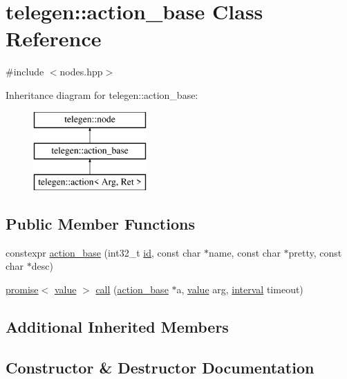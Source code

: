 \hypertarget{classtelegen_1_1action__base}{}\section{telegen\+:\+:action\+\_\+base Class Reference}
\label{classtelegen_1_1action__base}


{\ttfamily \#include $<$nodes.\+hpp$>$}

Inheritance diagram for telegen\+:\+:action\+\_\+base\+:\begin{figure}[H]
\begin{center}
\leavevmode
\includegraphics[height=3.000000cm]{classtelegen_1_1action__base}
\end{center}
\end{figure}
\subsection*{Public Member Functions}
\begin{DoxyCompactItemize}
\item 
constexpr \hyperlink{classtelegen_1_1action__base_a50c033aec11f3533b47fe7ad799ecb1d}{action\+\_\+base} (int32\+\_\+t \hyperlink{classtelegen_1_1node_aae3ff0d12932c55fdc88a1743e27ea56}{id}, const char $\ast$name, const char $\ast$pretty, const char $\ast$desc)
\item 
\hyperlink{namespacetelegen_a9dd802bb5d30cf96b0c616750d43ae86}{promise}$<$ \hyperlink{classtelegen_1_1value}{value} $>$ \hyperlink{classtelegen_1_1action__base_aa05f686e2a085c773bcbc8ac07da6f04}{call} (\hyperlink{classtelegen_1_1action__base}{action\+\_\+base} $\ast$a, \hyperlink{classtelegen_1_1value}{value} arg, \hyperlink{namespacetelegen_ad925de2d0a99bc43918533abf0457344}{interval} timeout)
\end{DoxyCompactItemize}
\subsection*{Additional Inherited Members}


\subsection{Constructor \& Destructor Documentation}
\mbox{\label{classtelegen_1_1action__base_a50c033aec11f3533b47fe7ad799ecb1d}} 
